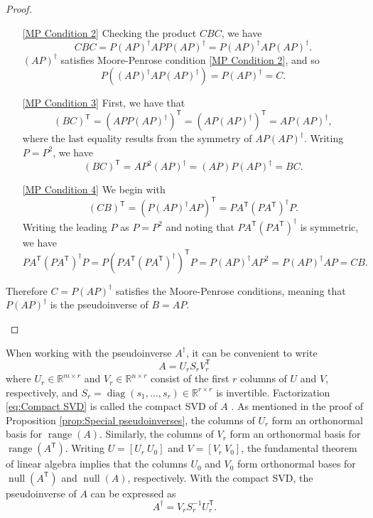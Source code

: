 \documentclass[12pt]{article}
\newcommand{\trans}[1]{{#1}^\mathsf{T}}	%
\newcommand{\inv}[1]{{#1}^{-1}}	%
\newcommand{\pinv}[1]{{#1}^\dagger}	%
\DeclareMathOperator{\diag}{diag}	%
\DeclareMathOperator{\range}{range}	%
\DeclareMathOperator{\nullspace}{null}	%
\newcommand{\singular}{s}	%
\begin{document}
\begin{proof}
\begin{enumerate}
\begin{enumerate}
        \item[\ref{MP Condition 2}] Checking the product $CBC$, we have 
        \[CBC = P\pinv{\left(AP\right)}APP\pinv{\left(AP\right)} = P\pinv{\left(AP\right)}AP\pinv{\left(AP\right)}.\]
        $\pinv{\left(AP\right)}$ satisfies Moore-Penrose condition \ref{MP Condition 2}, and so
        \[P\left(\pinv{\left(AP\right)}AP\pinv{\left(AP\right)}\right) = P\pinv{\left(AP\right)} = C.\]
        \item[\ref{MP Condition 3}] First, we have that \[\trans{\left(BC\right)} = \trans{\left(APP\pinv{\left(AP\right)}\right)} = \trans{\left(AP\pinv{\left(AP\right)}\right)} = AP\pinv{\left(AP\right)},\]
        where the last equality results from the symmetry of $AP\pinv{\left(AP\right)}$. Writing $P = P^2$, we have
        \[\trans{\left(BC\right)} = AP^2\pinv{\left(AP\right)} = \left(AP\right)P\pinv{\left(AP\right)} = BC.\]
        \item[\ref{MP Condition 4}] We begin with
        \[\trans{\left(CB\right)} = \trans{\left(P\pinv{\left(AP\right)}AP\right)} = P\trans{A}\pinv{\left(P\trans{A}\right)}P.\]
        Writing the leading $P$ as $P = P^2$ and noting that $P\trans{A}\pinv{\left(P\trans{A}\right)}$ is symmetric, we have
        \[P\trans{A}\pinv{\left(P\trans{A}\right)}P = P\trans{\left(P\trans{A}\pinv{\left(P\trans{A}\right)}\right)}P = P\pinv{\left(AP\right)}AP^2 = P\pinv{\left(AP\right)}AP = CB.\]
    \end{enumerate}
    Therefore $C = P\pinv{\left(AP\right)}$ satisfies the Moore-Penrose conditions, meaning that $P\pinv{\left(AP\right)}$ is the pseudoinverse of $B = AP$.
\end{enumerate}
\end{proof}

When working with the pseudoinverse $\pinv{A}$, it can be convenient to write
\begin{equation}
\label{eq:Compact SVD}
A = U_rS_r\trans{V}_r
\end{equation}
where $U_r \in \mathbb{R}^{m \times r}$ and $V_r \in \mathbb{R}^{n \times r}$ consist of the first $r$ columns of $U$ and $V$, respectively, and $S_r = \diag(\singular_1,\ldots,\singular_{r}) \in \mathbb{R}^{r \times r}$ is invertible. Factorization \eqref{eq:Compact SVD} is called the compact SVD of $A$ \cite{ABT,Leon2010}. As mentioned in the proof of Proposition \ref{prop:Special pseudoinverses}, the columns of $U_r$ form an orthonormal basis for $\range(A)$. Similarly, the columns of $V_r$ form an orthonormal basis for $\range(\trans{A})$. Writing $U = [U_r ~ U_0]$ and $V = [V_r ~ V_0]$, the fundamental theorem of linear algebra \cite{Strang1993} implies that the columns $U_0$  and $V_0$ form orthonormal bases for $\nullspace(\trans{A})$ and $\nullspace(A)$, respectively. With the compact SVD, the pseudoinverse of $A$ can be expressed as 
\begin{equation}
\label{eq:Pseudoinverse}
    \pinv{A} = V_r\inv{S}_r\trans{U}_r.
\end{equation}
\end{document}

